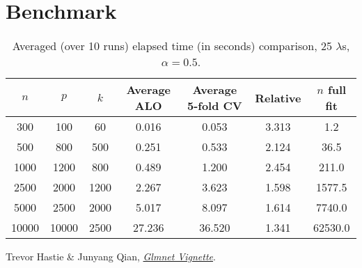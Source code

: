 \documentclass[11pt]{article}
\begin{document}
\section{Benchmark}
\begin{table}[H]
	\centering
	\begin{tabular}{ccc|cc|c|c}
		\hline\hline
		\(n\) & \(p\) & \(k\) & Average ALO & Average 5-fold CV & Relative & \(n\) full fit \\\hline
		300 & 100 & 60 & 0.016 & 0.053 & 3.313 & 1.2\\
		500 & 800 & 500 & 0.251 & 0.533 & 2.124 & 36.5\\
		1000 & 1200 & 800 & 0.489 & 1.200 & 2.454 & 211.0\\
		2500 & 2000 & 1200 & 2.267 & 3.623 & 1.598 & 1577.5\\
		5000 & 2500 & 2000 & 5.017 & 8.097 & 1.614 & 7740.0\\
		10000 & 10000 & 2500 & 27.236 & 36.520 & 1.341 & 62530.0\\\hline
	\end{tabular} 
	\caption{Averaged (over 10 runs) elapsed time (in seconds) comparison, 25 \(\lambda\)s, \(\alpha=0.5\).}
\end{table}

\begin{thebibliography}{1}
 Trevor Hastie \& Junyang Qian, \href{https://web.stanford.edu/~hastie/glmnet/glmnet_alpha.html}{\emph{Glmnet Vignette}}.
	
\end{thebibliography}
\end{document}
